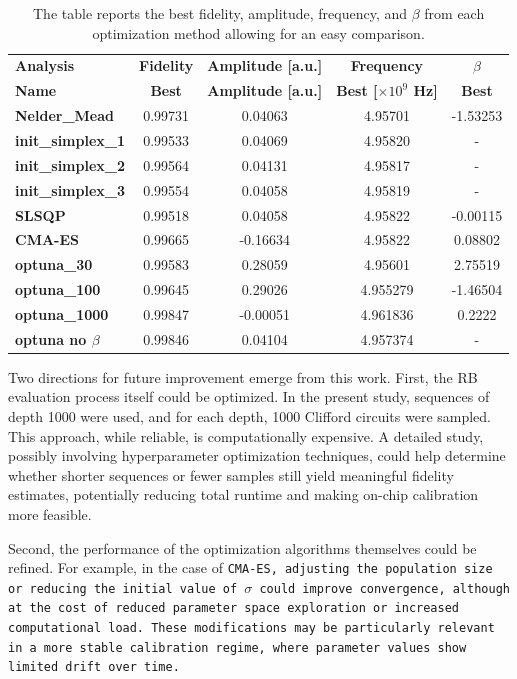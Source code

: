 \begin{table}[h]
    \centering
    \begin{tabular}{lcccc}
        \toprule
        \textbf{Analysis} & \textbf{Fidelity} & \textbf{Amplitude [a.u.]} & \textbf{Frequency} & \textbf{$\beta$} \\
        \textbf{Name} & \textbf{Best} & \textbf{Amplitude [a.u.]} & \textbf{Best [$\times10^9$ Hz]} & \textbf{Best} \\
        \midrule
        \textbf{Nelder\_Mead} & 0.99731 & 0.04063 & 4.95701 & -1.53253 \\
        \textbf{init\_simplex\_1} & 0.99533 & 0.04069 & 4.95820 & - \\
        \textbf{init\_simplex\_2} & 0.99564 & 0.04131 & 4.95817 & - \\
        \textbf{init\_simplex\_3} & 0.99554 & 0.04058 & 4.95819 & - \\
        \textbf{SLSQP} & 0.99518 & 0.04058 & 4.95822 & -0.00115 \\
        \textbf{CMA-ES} & 0.99665 & -0.16634 & 4.95822 & 0.08802 \\
        \textbf{optuna\_30} & 0.99583 & 0.28059 & 4.95601 & 2.75519 \\
        \textbf{optuna\_100} & 0.99645 & 0.29026 & 4.955279 & -1.46504 \\
        \textbf{optuna\_1000} & 0.99847 & -0.00051 & 4.961836 & 0.2222 \\
        \textbf{optuna no $\beta$} & 0.99846 & 0.04104 & 4.957374 & - \\
        \bottomrule
    \end{tabular}
    \caption{The table reports the best fidelity, amplitude, frequency, and $\beta$ from each optimization method allowing for an easy comparison.}
    \label{tab:best_param}
\end{table}

Two directions for future improvement emerge from this work. 
First, the RB evaluation process itself could be optimized. 
In the present study, sequences of depth 1000 were used, and for each depth, 1000 Clifford circuits were sampled. %
This approach, while reliable, is computationally expensive. 
A detailed study, possibly involving hyperparameter optimization techniques, could help determine whether shorter sequences or fewer samples still yield meaningful fidelity estimates, potentially reducing total runtime and making on-chip calibration more feasible.

Second, the performance of the optimization algorithms themselves could be refined. 
For example, in the case of \tt{CMA-ES}, adjusting the population size or reducing the initial value of $\sigma$ could improve convergence, although at the cost of reduced parameter space exploration or increased computational load. 
These modifications may be particularly relevant in a more stable calibration regime, where parameter values show limited drift over time.


